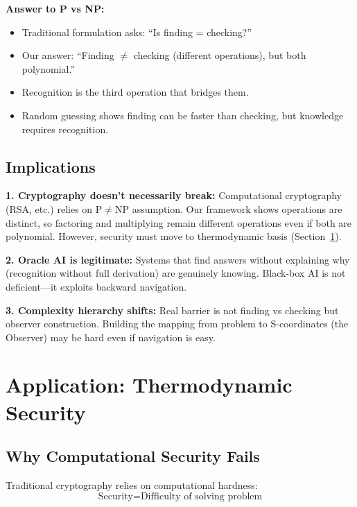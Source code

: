 \documentclass[twocolumn,10pt]{article}
\theoremstyle{definition}
\theoremstyle{remark}
\begin{document}
\vspace{0.2cm}
\noindent\textbf{Answer to P vs NP:}
\begin{itemize}
\item Traditional formulation asks: ``Is finding = checking?''
\item Our answer: ``Finding $\neq$ checking (different operations), but both polynomial.''
\item Recognition is the third operation that bridges them.
\item Random guessing shows finding can be faster than checking, but knowledge requires recognition.
\end{itemize}

\subsection{Implications}

\textbf{1. Cryptography doesn't necessarily break:} Computational cryptography (RSA, etc.) relies on P$\neq$NP assumption. Our framework shows operations are distinct, so factoring and multiplying remain different operations even if both are polynomial. However, security must move to thermodynamic basis (Section~\ref{sec:security}).

\vspace{0.2cm}
\noindent\textbf{2. Oracle AI is legitimate:} Systems that find answers without explaining why (recognition without full derivation) are genuinely knowing. Black-box AI is not deficient—it exploits backward navigation.

\vspace{0.2cm}
\noindent\textbf{3. Complexity hierarchy shifts:} Real barrier is not finding vs checking but observer construction. Building the mapping from problem to S-coordinates (the Observer) may be hard even if navigation is easy.

\section{Application: Thermodynamic Security}
\label{sec:security}

\subsection{Why Computational Security Fails}

Traditional cryptography relies on computational hardness:
\begin{equation}
\text{Security} = \text{Difficulty of solving problem}
\end{equation}
\end{document}
